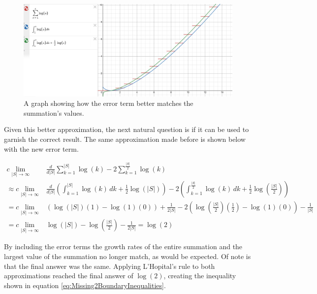 \documentclass{article}
\begin{document}
\begin{figure}[h]
    \center
    \includegraphics[scale=0.4]{img/DesmosLogErrProof.png}
    \caption{A graph showing how the error term better matches the summation's values.}
    \label{fig:DesmosErrProof}
\end{figure}

Given this better approximation, the next natural question is if it can be used to garnish the correct result. The same approximation made before is shown below with the new error term.

\begin{equation}
	\begin{split}
		c \lim_{|S|\to \infty} &
		\frac{d}{d|S|}
		\sum_{k=1}^{|S|}\log(k)-2\sum_{k=1}^{\frac{|S|}{2}}\log(k)
		\\
		\approx
		c \lim_{|S|\to \infty} &
		\frac{d}{d|S|}
		\left( 
			\int_{k=1}^{|S|}\log(k)\, dk
			+
			\frac{1}{2}\log(|S|)
		\right) - 2\left( 
			\int_{k=1}^{\frac{|S|}{2}}\log(k) \,dk
			+
			\frac{1}{2}\log\left( \frac{|S|}{2} \right)
		\right)
		\\
		=
		c \lim_{|S|\to \infty} &
		\left(
			\log(|S|)(1)-\log(1)(0)
		\right)
		+\frac{1}{2|S|}		
		-2\left(
			\log\left( \frac{|S|}{2} \right)\left( \frac{1}{2} \right)-\log(1)(0)
		\right) - \frac{1}{|S|}
		\\
		=
		c \lim_{|S|\to \infty} &
		\log(|S|)-\log\left( \frac{|S|}{2} \right)-\frac{1}{2|S|} = 
		\log(2)
	\end{split}
\end{equation}

By including the error terms the growth rates of the entire summation and the largest value of the summation no longer match, as would be expected. Of note is that the final answer was the same. Applying L'Hopital's rule to both approximations reached the final answer of $\log(2)$, creating the inequality shown in equation \ref{eq:Missing2BoundaryInequalities}.
\end{document}
